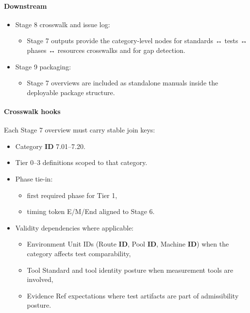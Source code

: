 \documentclass[10pt]{article}
\begin{document}
\paragraph*{Downstream}

\begin{itemize}
\item Stage 8 crosswalk and issue log:
  \begin{itemize}
  \item Stage 7 outputs provide the category-level nodes for standards ↔ tests ↔ phases ↔ resources crosswalks and for gap detection.
  \end{itemize}
\item Stage 9 packaging:
  \begin{itemize}
  \item Stage 7 overviews are included as standalone manuals inside the deployable package structure.
  \end{itemize}
\end{itemize}

\paragraph*{Crosswalk hooks}

Each Stage 7 overview must carry stable join keys:

\begin{itemize}
\item Category \textbf{ID} 7.01–7.20.
\item Tier 0–3 definitions scoped to that category.
\item Phase tie-in:
  \begin{itemize}
  \item first required phase for Tier 1,
  \item timing token E/M/End aligned to Stage 6.
  \end{itemize}
\item Validity dependencies where applicable:
  \begin{itemize}
  \item Environment Unit IDs (Route \textbf{ID}, Pool \textbf{ID}, Machine \textbf{ID}) when the category affects test comparability,
  \item Tool Standard and tool identity posture when measurement tools are involved,
  \item Evidence Ref expectations where test artifacts are part of admissibility posture.
  \end{itemize}
\end{itemize}
\end{document}
